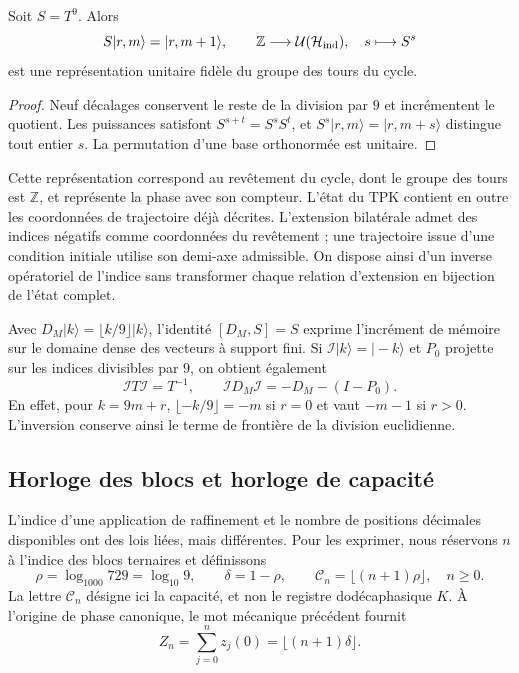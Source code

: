 \begin{proposition}
\label{mono-ampl:representacion}
Soit \(S=T^9\). Alors
\[
 S|r,m\rangle=|r,m+1\rangle,\qquad
 \mathbb Z\longrightarrow\mathcal U(\mathcal H_{\rm ind}),
 \quad s\longmapsto S^s
\]
est une représentation unitaire fidèle du groupe des tours du cycle.
\end{proposition}
\begin{proof}
Neuf décalages conservent le reste de la division par \(9\) et
incrémentent le quotient. Les puissances satisfont
\(S^{s+t}=S^sS^t\), et \(S^s|r,m\rangle=|r,m+s\rangle\) distingue
tout entier \(s\). La permutation d'une base orthonormée est unitaire.
\end{proof}

Cette représentation correspond au revêtement du cycle, dont le groupe
des tours est \(\mathbb Z\), et représente la phase avec son compteur. L'état
du TPK contient en outre les coordonnées de trajectoire déjà décrites.
L'extension bilatérale admet des indices négatifs comme coordonnées du
revêtement ; une trajectoire issue d'une condition initiale utilise
son demi-axe admissible. On dispose ainsi d'un inverse opératoriel
de l'indice sans transformer chaque relation d'extension en bijection de
l'état complet.

Avec \(D_M|k\rangle=\lfloor k/9\rfloor|k\rangle\), l'identité
\([D_M,S]=S\) exprime l'incrément de mémoire sur le domaine dense des
vecteurs à support fini. Si \(\mathcal I|k\rangle=|-k\rangle\) et
\(P_0\) projette sur les indices divisibles par \(9\), on obtient
également
\begin{equation}
 \mathcal I T\mathcal I=T^{-1},\qquad
 \mathcal I D_M\mathcal I=-D_M-(I-P_0).
 \label{mono-ampl:inversion-contador}
\end{equation}
En effet, pour \(k=9m+r\),
\(\lfloor-k/9\rfloor=-m\) si \(r=0\) et vaut \(-m-1\) si \(r>0\).
L'inversion conserve ainsi le terme de frontière de la division euclidienne.

\subsection{Horloge des blocs et horloge de capacité}
\label{mono-ampl:relojes}

L'indice d'une application de raffinement et le nombre de positions
décimales disponibles ont des lois liées, mais différentes. Pour
les exprimer, nous réservons \(n\) à l'indice des blocs ternaires et définissons
\[
 \rho=\log_{1000}729=\log_{10}9,\qquad
 \delta=1-\rho,\qquad
 \mathcal C_n=\lfloor(n+1)\rho\rfloor,\quad n\geq0.
\]
La lettre \(\mathcal C_n\) désigne ici la capacité, et non le registre
dodécaphasique \(K\). À l'origine de phase canonique, le mot mécanique
précédent fournit
\[
 Z_n=\sum_{j=0}^{n}z_j(0)=\lfloor(n+1)\delta\rfloor.
\]

